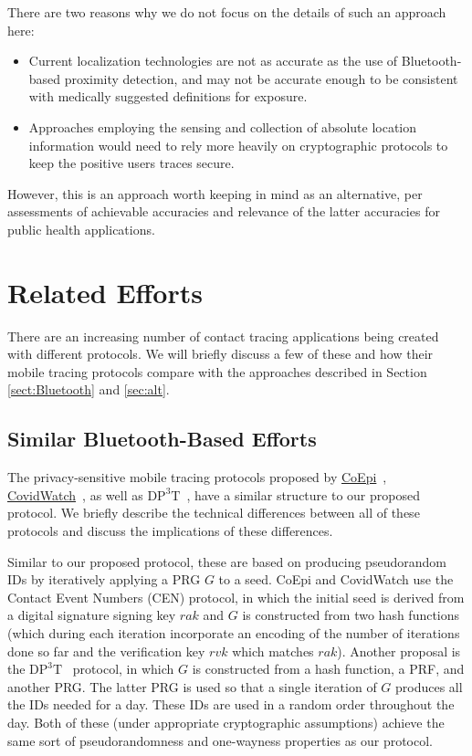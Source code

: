 There are two reasons why we do not focus on the details of such an approach here:
\begin{itemize}
    \item Current localization technologies are not as accurate as the use of Bluetooth-based proximity detection, and may not be accurate enough to be consistent with medically suggested definitions for exposure.
    \item Approaches employing the sensing and collection of absolute location information would need to rely more heavily on cryptographic protocols to keep the positive users traces secure.
\end{itemize}
However, this is an approach worth keeping in mind as an alternative, per assessments of achievable accuracies and relevance of the latter accuracies for public health applications.

\section{Related Efforts}
\label{sec:alternatives}
\label{sec:comparisons}

There are an increasing number of contact tracing applications being created with different protocols.
We will briefly discuss a few of these and how their mobile tracing protocols compare with the approaches described in Section \ref{sect:Bluetooth} and \ref{sec:alt}.

\subsection{Similar Bluetooth-Based Efforts}
The privacy-sensitive mobile tracing protocols proposed by
\href{https://www.coepi.org/}{CoEpi}~\cite{coepi},
\href{https://www.covid-watch.org/}{CovidWatch}~\cite{covidwatch},
as well as \href{https://github.com/DP-3T/documents}{$\mathrm{DP^3T}$}~\cite{dp3t}, 
have a similar structure to our proposed protocol.
We briefly describe the technical differences between all of these protocols and discuss the implications of these differences.

Similar to our proposed protocol, these are based on producing pseudorandom IDs by iteratively applying a PRG $G$ to a seed.
CoEpi and CovidWatch use the Contact Event Numbers (CEN) protocol, in which the initial seed is derived from a digital signature signing key $rak$ and $G$ is constructed from two hash functions (which during each iteration incorporate an encoding of the number of iterations done so far and the verification key $rvk$ which matches $rak$).
Another proposal is the $\mathrm{DP^3T}$~\cite{dp3t} protocol, in which $G$ is constructed from a hash function, a PRF, and another PRG.
The latter PRG is used so that a single iteration of $G$ produces all the IDs needed for a day.
These IDs are used in a random order throughout the day.
Both of these (under appropriate cryptographic assumptions) achieve the same sort of pseudorandomness and one-wayness properties as our protocol.

